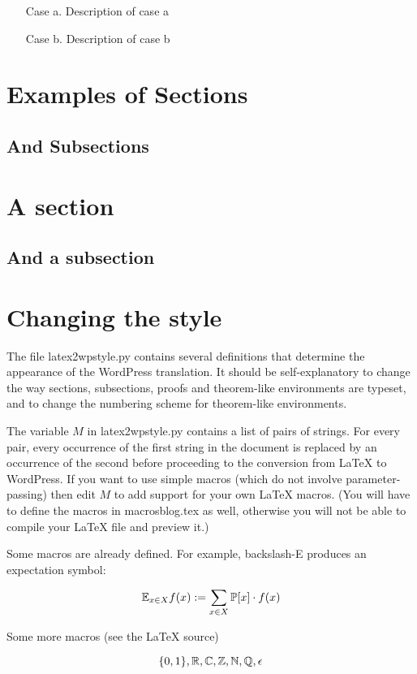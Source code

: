 \documentclass[12pt]{article}
\begin{document}
\begin{itemize}
\item [Case a.] Description of case a
\item [Case b.] Description of case b
\end{itemize}

\section*{Examples of Sections}

\subsection*{And Subsections}

\section{A section}
\label{sec}

\subsection{And a subsection}

\section{Changing the style}

The file latex2wpstyle.py contains several definitions that determine
the appearance of the WordPress translation. It should be self-explanatory
to change the way sections, subsections, proofs and theorem-like
environments are typeset, and to change the numbering scheme
for theorem-like environments.

The variable $M$ in latex2wpstyle.py contains a list of pairs of strings.
For every pair, every occurrence of the first string in the document is
replaced by an occurrence of the second before proceeding to the
conversion from LaTeX to WordPress. If you want to use simple macros
(which do not involve parameter-passing) then edit $M$ to add support
for your own LaTeX macros. (You will have to define the macros in
macrosblog.tex as well, otherwise you will not be able to compile
your LaTeX file and preview it.)

Some macros are already defined. For example, backslash-E produces
an expectation symbol:

\[ {\mathbb E}_{x \in X} f(x) := \sum_{x\in X} {\mathbb P} [x] \cdot f(x) \]

Some more macros (see the LaTeX source)

\[ \{0,1\}, {\mathbb R} , {\mathbb C}, {\mathbb Z}, {\mathbb N} , {\mathbb Q},  {\epsilon} \]
\end{document}
